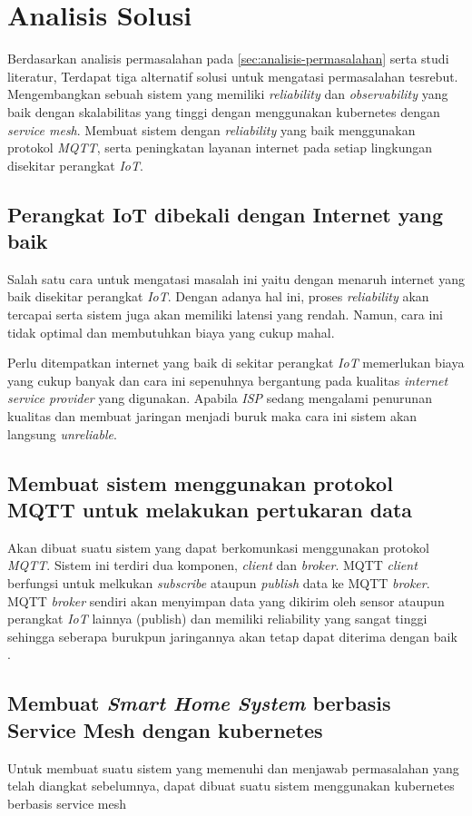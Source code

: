 \section{Analisis Solusi}

Berdasarkan analisis permasalahan pada \ref{sec:analisis-permasalahan} serta studi literatur, Terdapat tiga alternatif solusi untuk mengatasi permasalahan tesrebut.
Mengembangkan sebuah sistem yang memiliki \textit{reliability} dan \textit{observability} yang baik dengan skalabilitas yang tinggi dengan menggunakan kubernetes dengan \textit{service mesh}. Membuat sistem dengan \textit{reliability} yang baik  menggunakan protokol \textit{MQTT}, serta peningkatan layanan internet pada setiap lingkungan disekitar perangkat \textit{IoT}.

\subsection{Perangkat IoT dibekali dengan Internet yang baik}
Salah satu cara untuk mengatasi masalah ini yaitu dengan menaruh internet yang baik disekitar perangkat \textit{IoT}. Dengan adanya hal ini, proses \textit{reliability} akan tercapai serta sistem juga akan memiliki latensi yang rendah. Namun, cara ini tidak optimal dan membutuhkan biaya yang cukup mahal.

Perlu ditempatkan internet yang baik di sekitar perangkat \textit{IoT} memerlukan biaya yang cukup banyak dan cara ini sepenuhnya bergantung pada kualitas \textit{internet service provider} yang digunakan. Apabila \textit{ISP} sedang mengalami penurunan kualitas dan membuat jaringan menjadi buruk maka cara ini sistem akan langsung \textit{unreliable}.

\subsection{Membuat sistem menggunakan protokol MQTT untuk melakukan pertukaran data}
Akan dibuat suatu sistem yang dapat berkomunkasi menggunakan protokol \textit{MQTT}. Sistem ini terdiri dua komponen, \textit{client} dan \textit{broker}. MQTT \textit{client} berfungsi untuk melkukan \textit{subscribe} ataupun \textit{publish} data ke MQTT \textit{broker}. MQTT \textit{broker} sendiri akan menyimpan data yang dikirim oleh sensor ataupun perangkat \textit{IoT} lainnya (publish) dan memiliki reliability yang sangat tinggi sehingga seberapa burukpun jaringannya akan tetap dapat diterima dengan baik \parencite{mqtt}.

\subsection{Membuat \textit{Smart Home System} berbasis Service Mesh dengan kubernetes}
Untuk membuat suatu sistem yang memenuhi dan menjawab permasalahan yang telah diangkat sebelumnya, dapat dibuat suatu sistem menggunakan kubernetes berbasis service mesh





